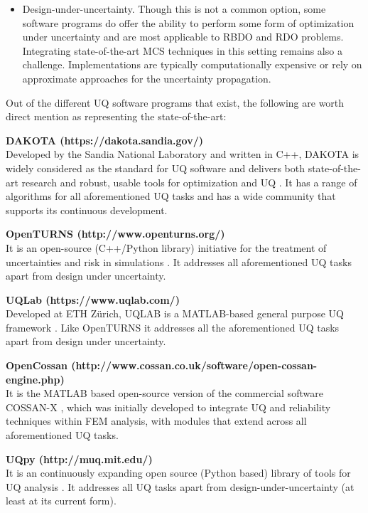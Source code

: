 \begin{itemize}
    \item Design-under-uncertainty. Though this is not a common option, some software programs do offer the ability to perform some form of optimization under uncertainty and are most applicable to RBDO and RDO problems. Integrating state-of-the-art MCS techniques in this setting remains also a challenge. Implementations are typically computationally expensive or rely on approximate approaches for the uncertainty propagation.
\end{itemize}

\noindent Out of the different UQ software programs that exist, the following are worth direct mention as representing the state-of-the-art: 
\newline

\noindent\textbf{DAKOTA (https://dakota.sandia.gov/)} \\Developed by the Sandia National Laboratory and written in C++, DAKOTA is widely considered as the standard for UQ software and delivers both state-of-the-art research and robust, usable tools for optimization and UQ \citep{adams2009dakota}. It has a range of algorithms for all aforementioned UQ tasks and has a wide community that supports its continuous development. 
\newline

\noindent\textbf{OpenTURNS (http://www.openturns.org/)} \\It is an open-source (C++/Python library) initiative for the treatment of uncertainties and risk in simulations \citep{andrianov2007open}. It addresses all aforementioned UQ tasks apart from design under uncertainty. 
\newline

\noindent\textbf{UQLab (https://www.uqlab.com/)} \\Developed at ETH Zürich, UQLAB is a MATLAB-based general purpose UQ framework \citep{marelli2014uqlab}. Like OpenTURNS it addresses all the aforementioned UQ tasks apart from design under uncertainty. 
\newline

\noindent\textbf{OpenCossan (http://www.cossan.co.uk/software/open-cossan-engine.php)} \\It is the MATLAB based open-source version of the commercial software COSSAN-X \citep{patelli2017cossan}, which was initially developed to integrate UQ and reliability techniques within FEM analysis, with modules that extend across all aforementioned UQ tasks.

\noindent\textbf{UQpy  (http://muq.mit.edu/)} \\It is an continuously expanding open source (Python based) library of tools for UQ analysis \citep{olivier2020uqpy}. It addresses all UQ tasks apart from design-under-uncertainty (at least at its current form).

